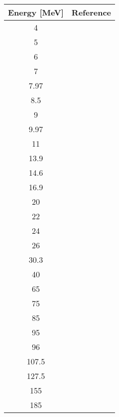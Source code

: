 \begin{tabular}{|c||c|} 
    \hline 
    \bf{Energy [MeV]} & \bf{Reference} \\
    \hline
    \hline 
    4 & \cite{Annand85}\\
    5 & \cite{Annand85}\\
    6 & \cite{Annand85}\\
    7 & \cite{Annand85}\\
    7.97 & \cite{Roberts91}\\
    8.5 & \cite{Kinney74a}\\
    9 & \cite{Rapaport78}\\
    9.97 & \cite{Delaroche83}\\
    11 & \cite{Rapaport78}\\
    13.9 & \cite{Floyd82, FloydPhDThesis}\\
    14.6 & \cite{Hansen85}\\
    16.9 & \cite{FloydPhDThesis}\\
    20 & \cite{Finlay84}\\
    22 & \cite{Finlay84}\\
    24 & \cite{Finlay84}\\
    26 & \cite{Rapaport78}\\
    30.3 & \cite{DevitoPhDThesis}\\
    40 & \cite{DevitoPhDThesis}\\
    65 & \cite{Osborne04}\\
    75 & \cite{Osborne04}\\
    85 & \cite{Osborne04}\\
    95 & \cite{Osborne04}\\
    96 & \cite{Osborne04}\\
    107.5 & \cite{Osborne04}\\
    127.5 & \cite{Osborne04}\\
    155 & \cite{Osborne04}\\
    185 & \cite{Osborne04}\\
    \hline
\end{tabular}

